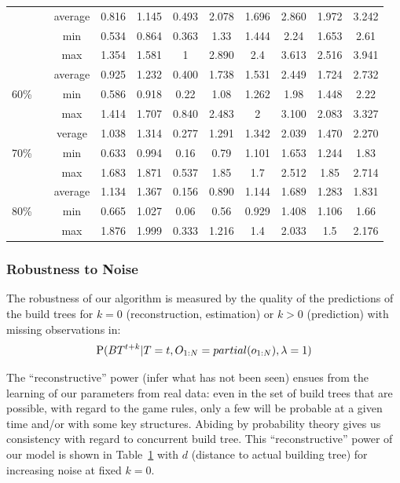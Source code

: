 \begin{table}[h]
\begin{center}
\begin{footnotesize}
\begin{tabular}{|c|c|cc|cc|cc|cc|}
& average & 0.816 & 1.145 & 0.493 & 2.078 & 1.696 & 2.860 & 1.972 & 3.242\\
& min & 0.534 & 0.864 & 0.363 & 1.33 & 1.444 & 2.24 & 1.653 & 2.61\\
& max & 1.354 & 1.581 & 1 & 2.890 & 2.4 & 3.613 & 2.516 & 3.941\\
\hline
\multirow{3}{3mm}{\begin{sideways}\parbox{3mm}{60\%\ \ }\end{sideways}}
& average & 0.925 & 1.232 & 0.400 & 1.738 & 1.531 & 2.449 & 1.724 & 2.732\\
& min & 0.586 & 0.918 & 0.22 & 1.08 & 1.262 & 1.98 & 1.448 & 2.22\\
& max & 1.414 & 1.707 & 0.840 & 2.483 & 2 & 3.100 & 2.083 & 3.327\\
\hline
\multirow{3}{3mm}{\begin{sideways}\parbox{3mm}{70\%\ \ }\end{sideways}}
& verage & 1.038 & 1.314 & 0.277 & 1.291 & 1.342 & 2.039 & 1.470 & 2.270\\
& min & 0.633 & 0.994 & 0.16 & 0.79 & 1.101 & 1.653 & 1.244 & 1.83\\
& max & 1.683 & 1.871 & 0.537 & 1.85 & 1.7 & 2.512 & 1.85 & 2.714\\
\hline
\multirow{3}{3mm}{\begin{sideways}\parbox{3mm}{80\%\ \ }\end{sideways}}
& average & 1.134 & 1.367 & 0.156 & 0.890 & 1.144 & 1.689 & 1.283 & 1.831\\
& min & 0.665 & 1.027 & 0.06 & 0.56 & 0.929 & 1.408 & 1.106 & 1.66\\
& max & 1.876 & 1.999 & 0.333 & 1.216 & 1.4 & 2.033 & 1.5 & 2.176\\
\hline
\end{tabular}
\label{tab:buildtreeresults}
\end{footnotesize}
\end{center}
\end{table}


\subsubsection{Robustness to Noise}
The robustness of our algorithm is measured by the quality of the predictions of the build trees for $k=0$ (reconstruction, estimation) or $k>0$ (prediction) with missing observations in:
$$ \mathrm{P}(BT^{t+k} | T=t, O_{1:N}=partial(o_{1:N}), \lambda = 1)$$

The ``reconstructive'' power (infer what has not been seen) ensues from the learning of our parameters from real data: even in the set of build trees that are possible, with regard to the game rules, only a few will be probable at a given time and/or with some key structures. Abiding by probability theory gives us consistency with regard to concurrent build tree.
This ``reconstructive'' power of our model is shown in Table~\ref{tab:buildtreeresults} with $d$ (distance to actual building tree) for increasing noise at fixed $k=0$. 

